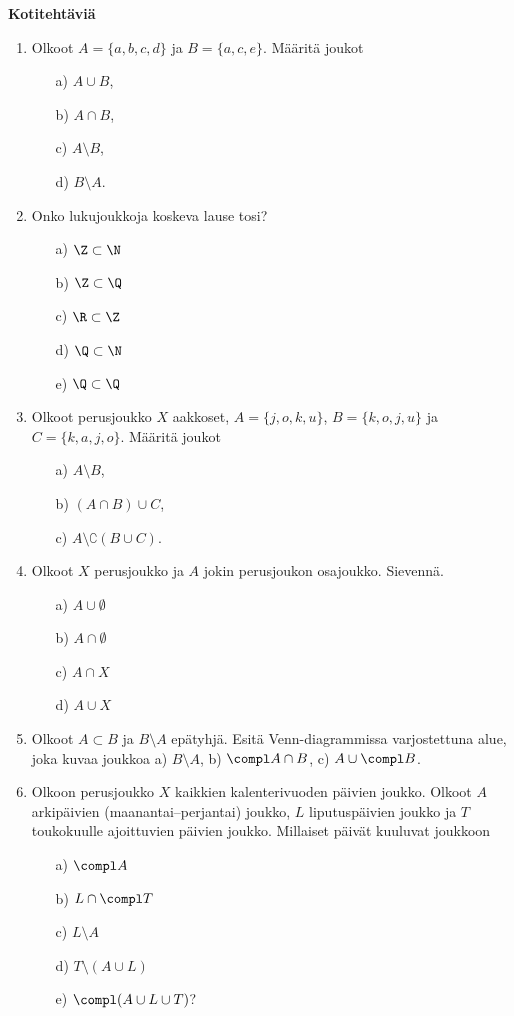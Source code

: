 {\bf Kotitehtäviä}

\begin{enumerate}

\item Olkoot $A = \{a,b,c,d\}$ ja $B=\{a,c,e\}$. Määritä joukot
\begin{itemize}
\item[a)] $A \cup B$, 
\item[b)] $A \cap B$,
\item[c)] $A \setminus B$,
\item[d)] $B \setminus A$.
\end{itemize}

\item Onko lukujoukkoja koskeva lause tosi?
\begin{itemize}
\item[a)] $\Z \subset \N$
\item[b)] $\Z \subset \Q$
\item[c)] $\R \subset \Z$
\item[d)] $\Q \subset \N$
\item[e)] $\Q \subset \Q$
\end{itemize}

\item Olkoot perusjoukko $X$ aakkoset, $A=\{j,o,k,u\}$, $B=\{k,o,j,u\}$ ja $C=\{k,a,j,o\}$. Määritä joukot
\begin{itemize}
\item[a)] $A\setminus B$,
\item[b)] $(A\cap B)\cup C$,
\item[c)] $A\setminus \complement (B\cup C)$.
\end{itemize}

\item Olkoot $X$ perusjoukko ja $A$ jokin perusjoukon osajoukko. Sievennä.
\begin{itemize}
\item[a)] $A\cup \emptyset$
\item[b)] $A\cap \emptyset$
\item[c)] $A\cap X$
\item[d)] $A\cup X$
\end{itemize}

\item
Olkoot $A \subset B$ ja $B \setminus A$ epätyhjä. Esitä Venn-diagrammissa varjostettuna alue, joka kuvaa joukkoa a) $B \setminus A$, b) $\compl A \cap B$, c) $A \cup \compl B$.

\item
Olkoon perusjoukko $X$ kaikkien kalenterivuoden päivien joukko. Olkoot $A$ arkipäivien (maanantai--perjantai) joukko, $L$ liputuspäivien joukko ja $T$ toukokuulle ajoittuvien päivien joukko. Millaiset päivät kuuluvat joukkoon
\begin{itemize}
\item[a)] $\compl A$
\item[b)] $L \cap \compl T$
\item[c)] $L \setminus A$
\item[d)] $T \setminus (A \cup L)$
\item[e)] $\compl (A \cup L \cup T)$?
\end{itemize}


\end{enumerate}
